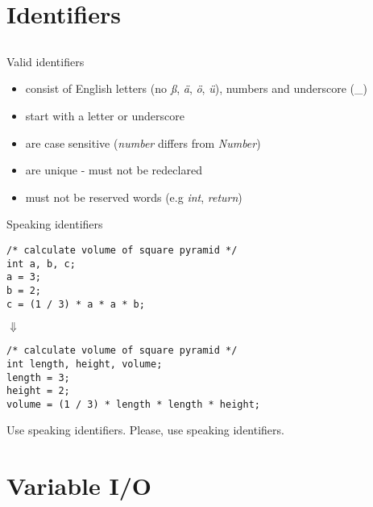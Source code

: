 \section{Identifiers}
\subsection{}
\begin{frame}{Valid identifiers}
	\begin{itemize}
		\item consist of English letters (no \textit{ß}, \textit{ä}, \textit{ö}, \textit{ü}), numbers and underscore (\_)
		\item start with a letter or underscore
		\item are case sensitive (\textit{number} differs from \textit{Number})
		\item are unique - must not be redeclared
		\item must not be reserved words (e.g \textit{int}, \textit{return})
	\end{itemize}
\end{frame}
\begin{frame}[fragile]{Speaking identifiers}
	\begin{lstlisting}
/* calculate volume of square pyramid */
int a, b, c;
a = 3;
b = 2;
c = (1 / 3) * a * a * b;
\end{lstlisting}
\centering
$\Downarrow$
	\begin{lstlisting}
/* calculate volume of square pyramid */
int length, height, volume;
length = 3;
height = 2;
volume = (1 / 3) * length * length * height;
\end{lstlisting}
\end{frame}
\begin{frame}{Use speaking identifiers.}
	\LARGE
	\centering
	Please, use speaking identifiers.\footnotemark
	
\end{frame}
\section{Variable I/O}
